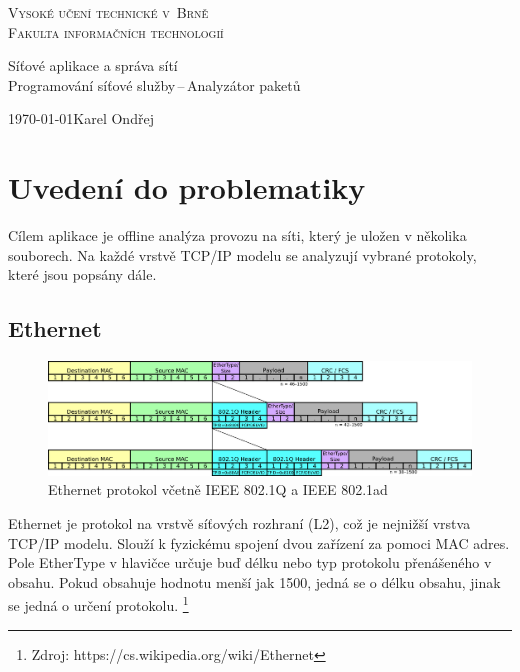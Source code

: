 \documentclass[11pt, a4paper]{article}
\begin{document}
\begin{titlepage}

\begin{center}
{\Huge \textsc{Vysoké učení technické v~Brně}\\[3mm]
\huge \textsc{Fakulta informačních technologií}}\\

{\LARGE Síťové aplikace a správa sítí\\[2mm]

\Huge Programování síťové služby\,--\,Analyzátor paketů}\\
\end{center}

{\Large \today \hfill Karel Ondřej}

\end{titlepage}

\tableofcontents

\newpage
\section{Uvedení do problematiky}

Cílem aplikace je offline analýza provozu na síti, který je uložen v několika souborech. Na každé vrstvě TCP/IP modelu se analyzují vybrané protokoly, které jsou popsány dále.

\subsection{Ethernet}

\begin{figure}[H]
  \includegraphics[width=\linewidth]{TCPIP_802_1ad_DoubleTag.png}
  \caption[]{Ethernet protokol včetně IEEE 802.1Q a IEEE 802.1ad\footnotemark}
  \label{fig:boat1}
\end{figure}
Ethernet je protokol na vrstvě síťových rozhraní (L2), což je nejnižší vrstva TCP/IP modelu. Slouží k fyzickému spojení dvou zařízení za pomoci MAC adres. 
Pole EtherType v hlavičce určuje buď délku nebo typ protokolu přenášeného v obsahu. 
Pokud obsahuje hodnotu menší jak 1500, jedná se o délku obsahu, jinak se jedná o určení protokolu. 
\footnote{Zdroj: https://cs.wikipedia.org/wiki/Ethernet}
\end{document}
